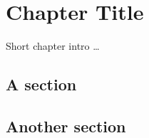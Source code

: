 \chapter{\label{cha:title}Chapter Title}

Short chapter intro \ldots

\section{A section}



\section{Another section}



